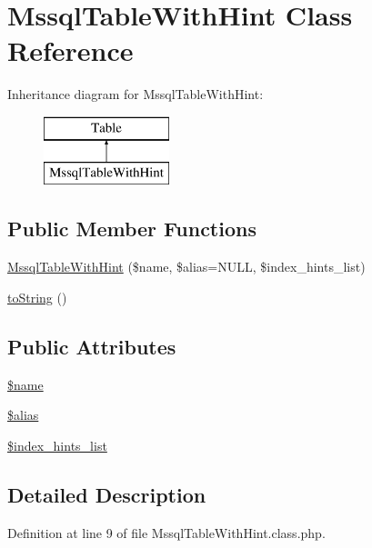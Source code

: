\hypertarget{classMssqlTableWithHint}{}\section{Mssql\+Table\+With\+Hint Class Reference}
\label{classMssqlTableWithHint}
Inheritance diagram for Mssql\+Table\+With\+Hint\+:\begin{figure}[H]
\begin{center}
\leavevmode
\includegraphics[height=2.000000cm]{classMssqlTableWithHint}
\end{center}
\end{figure}
\subsection*{Public Member Functions}
\begin{DoxyCompactItemize}
\item 
\hyperlink{classMssqlTableWithHint_a7d6526d0b856c8a5afe4b630b27ddbe4}{Mssql\+Table\+With\+Hint} (\$name, \$alias=N\+U\+LL, \$index\+\_\+hints\+\_\+list)
\item 
\hyperlink{classMssqlTableWithHint_ac73aaae941e5dd3f4c22d7c718a317f8}{to\+String} ()
\end{DoxyCompactItemize}
\subsection*{Public Attributes}
\begin{DoxyCompactItemize}
\item 
\hyperlink{classMssqlTableWithHint_a277ff00978ac421ee07783d796318bf5}{\$name}
\item 
\hyperlink{classMssqlTableWithHint_abe5643a9f48a397be1d66f7aba2fd7d9}{\$alias}
\item 
\hyperlink{classMssqlTableWithHint_af748588ba4420eb31c412a83b1623a60}{\$index\+\_\+hints\+\_\+list}
\end{DoxyCompactItemize}


\subsection{Detailed Description}


Definition at line 9 of file Mssql\+Table\+With\+Hint.\+class.\+php.



